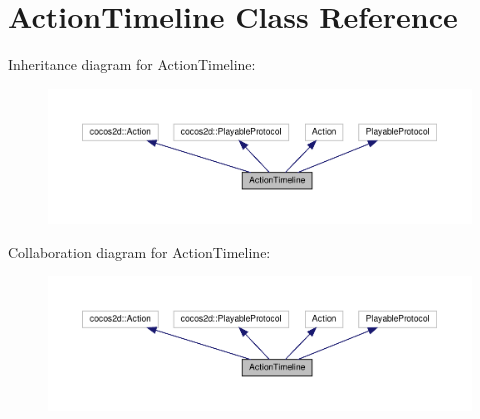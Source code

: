 \hypertarget{classActionTimeline}{}\section{Action\+Timeline Class Reference}
\label{classActionTimeline}


Inheritance diagram for Action\+Timeline\+:
\nopagebreak
\begin{figure}[H]
\begin{center}
\leavevmode
\includegraphics[width=350pt]{classActionTimeline__inherit__graph}
\end{center}
\end{figure}


Collaboration diagram for Action\+Timeline\+:
\nopagebreak
\begin{figure}[H]
\begin{center}
\leavevmode
\includegraphics[width=350pt]{classActionTimeline__coll__graph}
\end{center}
\end{figure}
